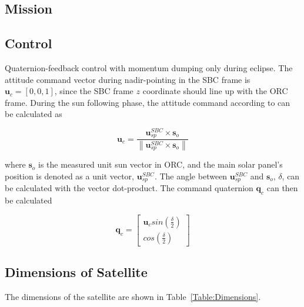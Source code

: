 \documentclass[letterpaper, 10 pt, conference]{ieeeconf}  %
\newcommand\norm[1]{\left\lVert#1\right\rVert}
\begin{document}
\subsection{Mission}


\subsection{Control}
Quaternion-feedback control with momentum dumping only during eclipse. The attitude command vector during nadir-pointing in the SBC frame is $\mathbf{u}_c = [0, 0, 1]$, since the SBC frame $z$ coordinate should line up with the ORC frame. During the sun following phase, the attitude command according to \textcite{chen2000ground} can be calculated as 

\begin{equation}
\mathbf{u}_c = \frac{\mathbf{u}_{sp}^{SBC} \times \mathbf{s}_o}{\norm{\mathbf{u}_{sp}^{SBC} \times \mathbf{s}_o}}
\end{equation}

where $\mathbf{s}_o$ is the measured unit sun vector in ORC, and the main solar panel's position is denoted as a unit vector, $\mathbf{u}_{sp}^{SBC}$. The angle between $\mathbf{u}_{sp}^{SBC}$ and $\mathbf{s}_o$, $\delta$, can be calculated with the vector dot-product. The command quaternion $\mathbf{q}_c$ can then be calculated

\begin{equation}
\mathbf{q}_c = \begin{bmatrix}
	\mathbf{u}_c sin(\frac{\delta}{2}) \\
	cos(\frac{\delta}{2})
\end{bmatrix}
\end{equation}


\subsection{Dimensions of Satellite}
The dimensions of the satellite are shown in Table~\ref{Table:Dimensions}.
\end{document}
